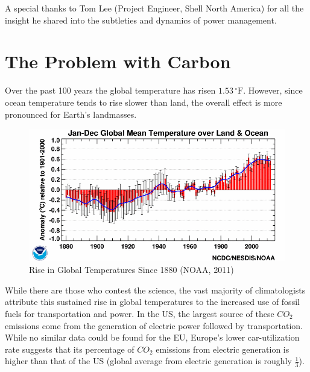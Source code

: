 \documentclass{article}
\begin{document}
\newpage{}

\vspace*{\fill}
A special thanks to Tom Lee (Project Engineer, Shell North America) for all the insight he shared into the subtleties and dynamics of power management.
\vspace*{\fill}


\newpage{}


\section{The Problem with Carbon}
Over the past 100 years the global temperature has risen $1.53\,^{\circ}\mathrm{F}$. However, since ocean temperature tends to rise slower than land, the overall effect is more pronounced for Earth's landmasses. 

\begin{figure}[H]
	\begin{center}
	\includegraphics[scale = .5]{Figures/meantemp.png}
	\caption{Rise in Global Temperatures Since 1880 (NOAA, 2011)}
	\end{center}
\end{figure}

While there are those who contest the science, the vast majority of climatologists attribute this sustained rise in global temperatures to the increased use of fossil fuels for transportation and power. In the US, the largest source of these $CO_{2}$ emissions come from the generation of electric power followed by transportation. While no similar data could be found for the EU, Europe's lower car-utilization rate suggests that its percentage of $CO_{2}$ emissions from electric generation is higher than that of the US (global average from electric generation is roughly $\frac{1}{3}$).
\end{document}

